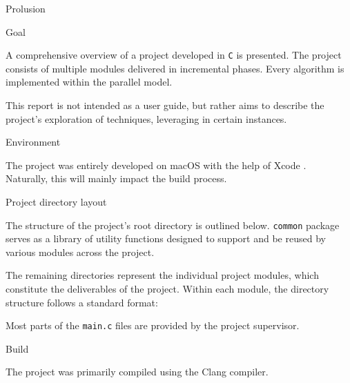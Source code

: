 \begin{chapter}{Prolusion}
	\begin{section}{Goal}
		\par A comprehensive overview of a  project developed in \texttt{C} is presented. The project consists of multiple modules delivered in incremental phases. Every algorithm is implemented within the \textbf{} parallel model. \\
		\par This report is not intended as a user guide, but rather aims to describe the project’s exploration of  techniques, leveraging  in certain instances.
	\end{section}
	\begin{section}{Environment}
		\par The project was entirely developed on macOS with the help of Xcode .\\
		Naturally, this will mainly impact the build process.
	\end{section}
	\clearpage
	\begin{section}{Project directory layout}
		\par The structure of the project’s root directory is outlined below.
		\medskip
		\medskip
		\texttt{common} package serves as a library of utility functions designed to support and be reused by various modules across the project.
		\vspace{\baselineskip}
		\par The remaining directories represent the individual project modules, which constitute the deliverables of the project. Within each module, the directory structure follows a standard format:
		\medskip
		\medskip
		\par Most parts of the \texttt{main.c} files are provided by the project supervisor.
	\end{section}
	\clearpage
	\begin{section}{Build}
		\par The project was primarily compiled using the Clang compiler.\\

\end{section}
\end{chapter}
